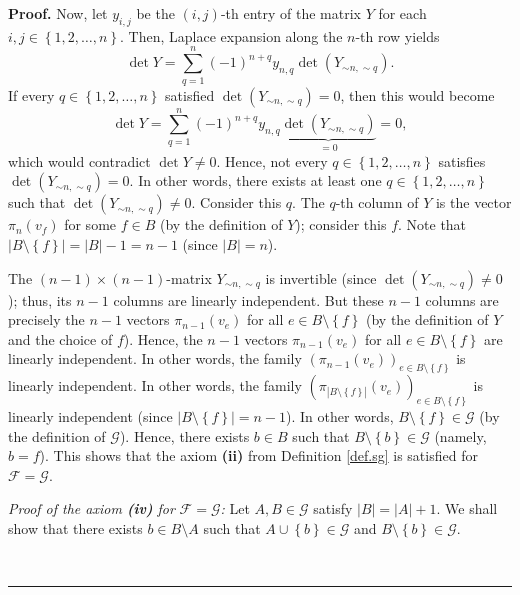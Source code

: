 \documentclass[numbers=enddot,12pt,final,onecolumn,notitlepage]{scrartcl}%
\theoremstyle{definition}
\newenvironment{proof}[1][Proof]{\noindent\textbf{#1.} }{\ \rule{0.5em}{0.5em}}
\let\sumnonlimits\sum
\renewcommand{\sum}{\sumnonlimits\limits}
\theoremstyle{plainsl}
\begin{document}
\begin{proof}
Now, let $y_{i,j}$ be the $\left(  i,j\right)  $-th entry of the matrix $Y$
for each $i,j\in\left\{  1,2,\ldots,n\right\}  $. Then, Laplace expansion
along the $n$-th row yields%
\[
\det Y=\sum_{q=1}^{n}\left(  -1\right)  ^{n+q}y_{n,q}\det\left(  Y_{\sim
n,\sim q}\right)  .
\]
If every $q\in\left\{  1,2,\ldots,n\right\}  $ satisfied $\det\left(  Y_{\sim
n,\sim q}\right)  =0$, then this would become%
\[
\det Y=\sum_{q=1}^{n}\left(  -1\right)  ^{n+q}y_{n,q}\underbrace{\det\left(
Y_{\sim n,\sim q}\right)  }_{=0}=0,
\]
which would contradict $\det Y\neq0$. Hence, not every $q\in\left\{
1,2,\ldots,n\right\}  $ satisfies $\det\left(  Y_{\sim n,\sim q}\right)  =0$.
In other words, there exists at least one $q\in\left\{  1,2,\ldots,n\right\}
$ such that $\det\left(  Y_{\sim n,\sim q}\right)  \neq0$. Consider this $q$.
The $q$-th column of $Y$ is the vector $\pi_{n}\left(  v_{f}\right)  $ for
some $f\in B$ (by the definition of $Y$); consider this $f$. Note that
$\left\vert B\setminus\left\{  f\right\}  \right\vert =\left\vert B\right\vert
-1=n-1$ (since $\left\vert B\right\vert =n$).

The $\left(  n-1\right)  \times\left(  n-1\right)  $-matrix $Y_{\sim n,\sim
q}$ is invertible (since $\det\left(  Y_{\sim n,\sim q}\right)  \neq0$); thus,
its $n-1$ columns are linearly independent. But these $n-1$ columns are
precisely the $n-1$ vectors $\pi_{n-1}\left(  v_{e}\right)  $ for all $e\in
B\setminus\left\{  f\right\}  $ (by the definition of $Y$ and the choice of
$f$). Hence, the $n-1$ vectors $\pi_{n-1}\left(  v_{e}\right)  $ for all $e\in
B\setminus\left\{  f\right\}  $ are linearly independent. In other words, the
family $\left(  \pi_{n-1}\left(  v_{e}\right)  \right)  _{e\in B\setminus
\left\{  f\right\}  }$ is linearly independent. In other words, the family
$\left(  \pi_{\left\vert B\setminus\left\{  f\right\}  \right\vert }\left(
v_{e}\right)  \right)  _{e\in B\setminus\left\{  f\right\}  }$ is linearly
independent (since $\left\vert B\setminus\left\{  f\right\}  \right\vert
=n-1$). In other words, $B\setminus\left\{  f\right\}  \in\mathcal{G}$ (by the
definition of $\mathcal{G}$). Hence, there exists $b\in B$ such that
$B\setminus\left\{  b\right\}  \in\mathcal{G}$ (namely, $b=f$). This shows
that the axiom \textbf{(ii)} from Definition \ref{def.sg} is satisfied for
$\mathcal{F}=\mathcal{G}$. \medskip

\textit{Proof of the axiom \textbf{(iv)} for }$\mathcal{F}=\mathcal{G}%
$\textit{:} Let $A,B\in\mathcal{G}$ satisfy $\left\vert B\right\vert
=\left\vert A\right\vert +1$. We shall show that there exists $b\in B\setminus
A$ such that $A\cup\left\{  b\right\}  \in\mathcal{G}$ and $B\setminus\left\{
b\right\}  \in\mathcal{G}$.


\end{proof}
\end{document}

